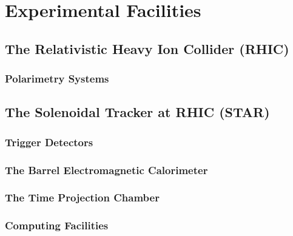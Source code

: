 \chapter{Experimental Facilities}

\section{The Relativistic Heavy Ion Collider (RHIC)}

\subsection{Polarimetry Systems}

\section{The Solenoidal Tracker at RHIC (STAR)}

\subsection{Trigger Detectors}

\subsection{The Barrel Electromagnetic Calorimeter}

\subsection{The Time Projection Chamber}

\subsection{Computing Facilities}
